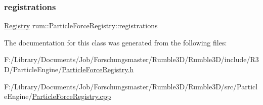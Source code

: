 \subsubsection{\texorpdfstring{registrations}{registrations}}
{\footnotesize\ttfamily \hyperlink{classrum_1_1_particle_force_registry_a63b7b5a4c79dafe5b3658505c7ac1163}{Registry} rum\+::\+Particle\+Force\+Registry\+::registrations\hspace{0.3cm}{\ttfamily [protected]}}



The documentation for this class was generated from the following files\+:\begin{DoxyCompactItemize}
\item 
F\+:/\+Library/\+Documents/\+Job/\+Forschungsmaster/\+Rumble3\+D/\+Rumble3\+D/include/\+R3\+D/\+Particle\+Engine/\hyperlink{_particle_force_registry_8h}{Particle\+Force\+Registry.\+h}\item 
F\+:/\+Library/\+Documents/\+Job/\+Forschungsmaster/\+Rumble3\+D/\+Rumble3\+D/src/\+Particle\+Engine/\hyperlink{_particle_force_registry_8cpp}{Particle\+Force\+Registry.\+cpp}\end{DoxyCompactItemize}
